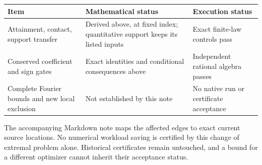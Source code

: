 \begin{center}
\begin{tabular}{p{43mm}p{48mm}p{49mm}}
\toprule
Item & Mathematical status & Execution status\\
\midrule
Attainment, contact, support transfer & Derived above, at fixed index;
quantitative support keeps its listed inputs & Exact finite-law controls pass\\
Conserved coefficient and sign gates & Exact identities and conditional
consequences above & Independent rational algebra passes\\
Complete Fourier bounds and new local exclusion & Not established by this
note & No native run or certificate acceptance\\
\bottomrule
\end{tabular}
\end{center}
The accompanying Markdown note maps the affected edges to exact current
source locations. No numerical workload saving is certified by this
change of extremal problem alone. Historical certificates remain
untouched, and a bound for a different optimizer cannot inherit their
acceptance status.
